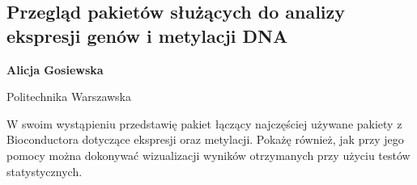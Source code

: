 \documentclass[\main/boa.tex]{subfiles}
\begin{document}
\subsection{Przegląd pakietów służących do analizy ekspresji genów i metylacji DNA}

\begin{minipage}{0.915\textwidth}
	\centering
  {\bf {} Alicja Gosiewska}
\end{minipage}

\vskip 0.3cm

\begin{affiliations}
\begin{minipage}{0.915\textwidth}
\centering
Politechnika Warszawska \\[-2pt]
\end{minipage}
\end{affiliations}

\vskip 0.8cm

 W swoim wystąpieniu przedstawię pakiet łączący najczęściej używane pakiety z Bioconductora dotyczące ekspresji oraz metylacji. Pokażę również, jak przy jego pomocy można dokonywać wizualizacji wyników otrzymanych przy użyciu testów statystycznych. 
 
\end{document}
